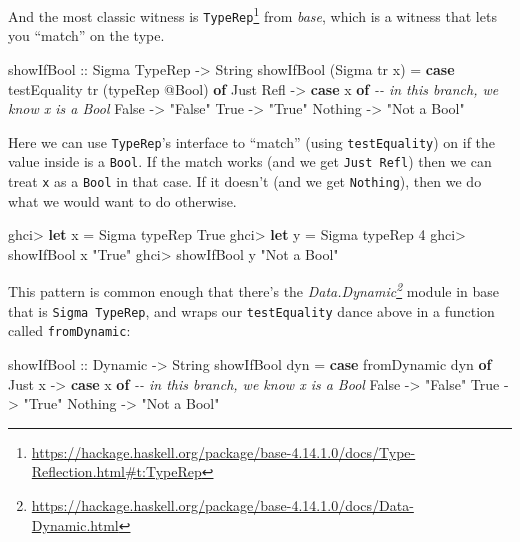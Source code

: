 \documentclass[]{article}
\newenvironment{Shaded}{}{}
\newcommand{\CommentTok}[1]{\textcolor[rgb]{0.38,0.63,0.69}{\textit{#1}}}
\newcommand{\DataTypeTok}[1]{\textcolor[rgb]{0.56,0.13,0.00}{#1}}
\newcommand{\DecValTok}[1]{\textcolor[rgb]{0.25,0.63,0.44}{#1}}
\newcommand{\KeywordTok}[1]{\textcolor[rgb]{0.00,0.44,0.13}{\textbf{#1}}}
\newcommand{\NormalTok}[1]{#1}
\newcommand{\OperatorTok}[1]{\textcolor[rgb]{0.40,0.40,0.40}{#1}}
\newcommand{\OtherTok}[1]{\textcolor[rgb]{0.00,0.44,0.13}{#1}}
\newcommand{\StringTok}[1]{\textcolor[rgb]{0.25,0.44,0.63}{#1}}
\renewcommand{\href}[2]{#2\footnote{\url{#1}}}
\begin{document}
And the most classic witness is
\href{https://hackage.haskell.org/package/base-4.14.1.0/docs/Type-Reflection.html\#t:TypeRep}{\texttt{TypeRep}}
from \emph{base}, which is a witness that lets you ``match'' on the type.

\begin{Shaded}
\begin{Highlighting}[]
\OtherTok{showIfBool ::} \DataTypeTok{Sigma} \DataTypeTok{TypeRep} \OtherTok{{-}>} \DataTypeTok{String}
\NormalTok{showIfBool (}\DataTypeTok{Sigma}\NormalTok{ tr x) }\OtherTok{=} \KeywordTok{case}\NormalTok{ testEquality tr (typeRep }\OperatorTok{@}\DataTypeTok{Bool}\NormalTok{) }\KeywordTok{of}
    \DataTypeTok{Just} \DataTypeTok{Refl} \OtherTok{{-}>} \KeywordTok{case}\NormalTok{ x }\KeywordTok{of}      \CommentTok{{-}{-} in this branch, we know x is a Bool}
      \DataTypeTok{False} \OtherTok{{-}>} \StringTok{"False"}
      \DataTypeTok{True}  \OtherTok{{-}>} \StringTok{"True"}
    \DataTypeTok{Nothing} \OtherTok{{-}>} \StringTok{"Not a Bool"}
\end{Highlighting}
\end{Shaded}

Here we can use \texttt{TypeRep}'s interface to ``match'' (using
\texttt{testEquality}) on if the value inside is a \texttt{Bool}. If the match
works (and we get \texttt{Just\ Refl}) then we can treat \texttt{x} as a
\texttt{Bool} in that case. If it doesn't (and we get \texttt{Nothing}), then we
do what we would want to do otherwise.

\begin{Shaded}
\begin{Highlighting}[]
\NormalTok{ghci}\OperatorTok{>} \KeywordTok{let}\NormalTok{ x }\OtherTok{=} \DataTypeTok{Sigma}\NormalTok{ typeRep }\DataTypeTok{True}
\NormalTok{ghci}\OperatorTok{>} \KeywordTok{let}\NormalTok{ y }\OtherTok{=} \DataTypeTok{Sigma}\NormalTok{ typeRep }\DecValTok{4}
\NormalTok{ghci}\OperatorTok{>}\NormalTok{ showIfBool x}
\StringTok{"True"}
\NormalTok{ghci}\OperatorTok{>}\NormalTok{ showIfBool y}
\StringTok{"Not a Bool"}
\end{Highlighting}
\end{Shaded}

This pattern is common enough that there's the
\emph{\href{https://hackage.haskell.org/package/base-4.14.1.0/docs/Data-Dynamic.html}{Data.Dynamic}}
module in base that is \texttt{Sigma\ TypeRep}, and wraps our
\texttt{testEquality} dance above in a function called \texttt{fromDynamic}:

\begin{Shaded}
\begin{Highlighting}[]
\OtherTok{showIfBool ::} \DataTypeTok{Dynamic} \OtherTok{{-}>} \DataTypeTok{String}
\NormalTok{showIfBool dyn }\OtherTok{=} \KeywordTok{case}\NormalTok{ fromDynamic dyn }\KeywordTok{of}
    \DataTypeTok{Just}\NormalTok{ x }\OtherTok{{-}>} \KeywordTok{case}\NormalTok{ x }\KeywordTok{of}      \CommentTok{{-}{-} in this branch, we know x is a Bool}
      \DataTypeTok{False} \OtherTok{{-}>} \StringTok{"False"}
      \DataTypeTok{True}  \OtherTok{{-}>} \StringTok{"True"}
    \DataTypeTok{Nothing} \OtherTok{{-}>} \StringTok{"Not a Bool"}
\end{Highlighting}
\end{Shaded}
\end{document}
